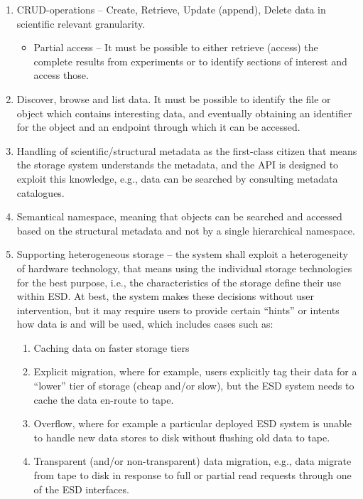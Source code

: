 \begin{enumerate}
\item CRUD-operations -- Create, Retrieve, Update (append), Delete data in scientific relevant granularity.
\begin{itemize}
\item Partial access --
It must be possible to either retrieve (access) the complete results from experiments or to identify sections of interest and access those.
\end{itemize}
\item Discover, browse and list data. It must be possible to identify the file or object which contains interesting data, and eventually obtaining an identifier for the object and an endpoint through which it can be accessed.

\item Handling of scientific/structural metadata as the first-class citizen that means the storage system understands the metadata, and the API is designed to exploit this knowledge, e.g., data can be searched by consulting metadata catalogues.
\item Semantical namespace, meaning that objects can be searched and accessed based on the structural metadata and not by a single hierarchical namespace.
\item Supporting heterogeneous storage -- the system shall exploit a heterogeneity of hardware technology, that means using the individual storage technologies for the best purpose, i.e., the characteristics of the storage define their use within ESD. At best, the system makes these decisions without user intervention, but it may require users to provide certain ``hints'' or intents how data is and will be used, which includes cases such as:
\begin{enumerate}
    \item Caching data on faster storage tiers
    \item Explicit migration, where for example, users explicitly tag their data for a ``lower'' tier of storage (cheap and/or slow), but the ESD system needs to cache the data en-route to tape.
    \item Overflow, where for example a particular deployed ESD system is unable to handle new data stores to disk without flushing old data to tape.
    \item Transparent (and/or non-transparent) data migration, e.g., data migrate from tape to disk in response to full or partial read requests through one of the ESD interfaces.
\end {enumerate}



\end{enumerate}
